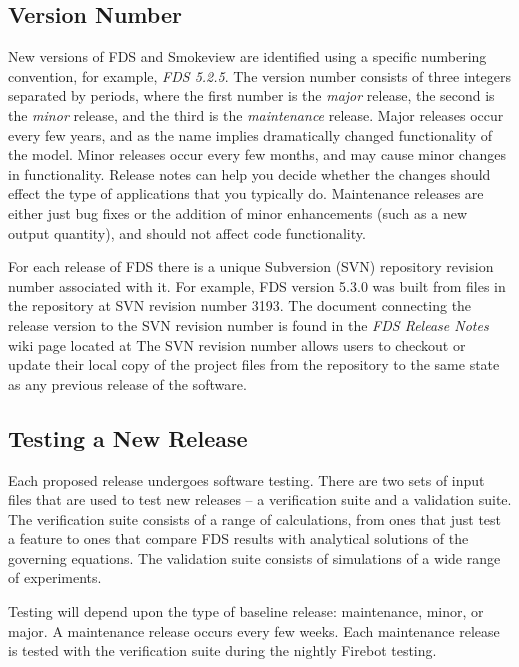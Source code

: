 \documentclass[11pt]{book}
\begin{document}
\subsection{Version Number}

New versions of FDS and Smokeview are identified using a specific numbering convention, for example, {\em FDS 5.2.5}.
The version number consists of three integers separated by periods, where the first number
is the {\em major} release, the second is the {\em minor} release, and the third is the {\em maintenance}
release.  Major releases occur every few years, and as the name implies dramatically changed functionality of the
model. Minor releases occur every few months, and may cause minor changes in functionality.
Release notes can help you decide whether the changes should effect the type of applications that you typically do.
Maintenance releases are either just bug fixes or the addition of minor enhancements (such as a new output quantity),
and should not affect code functionality.

For each release of FDS there is a unique Subversion (SVN) repository revision number associated with it.
For example, FDS version 5.3.0 was built from files in the repository at SVN revision number 3193.
The document connecting the release version to the SVN revision number is found in the {\em FDS Release Notes} wiki page
located at \href{http://code.google.com/p/fds-smv/wiki/FDS_Release_Notes}{}
The SVN revision number allows users to checkout or update their local copy of the project files from the repository to the same state as any previous release of the software.

\subsection{Testing a New Release}

Each proposed release undergoes software testing.  There are two sets of input files that are used to test new releases --
a verification suite and a validation suite. The verification suite consists of a range of calculations, from ones that just test a feature to
ones that compare FDS results with analytical solutions of the governing equations. The validation suite consists of simulations of a wide range
of experiments.

Testing will depend upon the type of baseline release:
maintenance, minor, or major. A maintenance release occurs every few weeks.
Each maintenance release is tested with the verification suite during the nightly Firebot testing.
\end{document}
